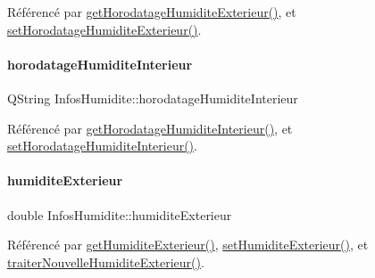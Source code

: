 Référencé par \hyperlink{class_infos_humidite_a04abb2841492704e125874464052bb4f}{get\+Horodatage\+Humidite\+Exterieur()}, et \hyperlink{class_infos_humidite_acc6231789bd923840dadf4f17310ce69}{set\+Horodatage\+Humidite\+Exterieur()}.

\mbox{\label{class_infos_humidite_a38712bac5a2d4d106a016647ad39fedf}} 
\paragraph{\texorpdfstring{horodatage\+Humidite\+Interieur}{horodatageHumiditeInterieur}}
{\footnotesize\ttfamily Q\+String Infos\+Humidite\+::horodatage\+Humidite\+Interieur\hspace{0.3cm}{\ttfamily [private]}}



Référencé par \hyperlink{class_infos_humidite_a841d2583f206a9097fa3871adc8be568}{get\+Horodatage\+Humidite\+Interieur()}, et \hyperlink{class_infos_humidite_a8054d13ab8f57504392756351c376534}{set\+Horodatage\+Humidite\+Interieur()}.

\mbox{\label{class_infos_humidite_a503a9c849508928d3046292f17f37230}} 
\paragraph{\texorpdfstring{humidite\+Exterieur}{humiditeExterieur}}
{\footnotesize\ttfamily double Infos\+Humidite\+::humidite\+Exterieur\hspace{0.3cm}{\ttfamily [private]}}



Référencé par \hyperlink{class_infos_humidite_a23e537fdfa33336a3970838f445387ce}{get\+Humidite\+Exterieur()}, \hyperlink{class_infos_humidite_a8228ff1f1d0466df228ed3f2e2d269ac}{set\+Humidite\+Exterieur()}, et \hyperlink{class_infos_humidite_a8d17fa3c7d15b1ff8130ae5d22702e5f}{traiter\+Nouvelle\+Humidite\+Exterieur()}.

\mbox{\label{class_infos_humidite_a62d1331116ee1cf00cb8fa369a214c62}} 
